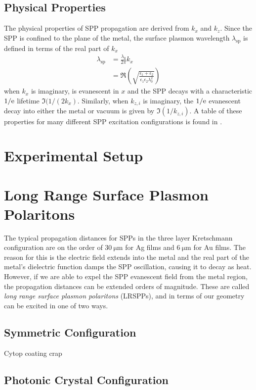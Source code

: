 \documentclass[a4paper,titlepage,onecolumn]{report}
\begin{document}
\subsection{Physical Properties}
The physical properties of SPP propagation are derived from $k_x$ and $k_z$.
Since the SPP is confined to the plane of the metal, the surface plasmon
wavelength $\lambda_\text{sp}$ is defined in terms of the real part of
$k_x$
\begin{align}
\lambda_\text{sp} &= \frac{\lambda_0}{2 \pi} k_x\\
& = \Re\left(\sqrt{
  \frac {\epsilon_1+\epsilon_2}
   {\epsilon_1 \epsilon_2 \lambda_0^2}
}\right)
\end{align}
when $k_x$ is imaginary,  is evanescent in
$x$ and the SPP decays with a characteristic $1/{\mathrm{e}}$ lifetime
$\Im(1/(2k_x)$.  Similarly, when $k_{z,i}$ is imaginary, the
$1/{\mathrm{e}}$ evanescent decay into either the metal or vacuum is given by
$\Im(1/k_{z,i})$.  A table of these properties for many different SPP
excitation configurations is found in .


\section{Experimental Setup}

\section{Long Range Surface Plasmon Polaritons}
The typical propagation distances for SPPs in the three layer Kretschmann configuration are on the order of $\SI{30}{\micro\meter}$ for Ag films and $\SI{6}{\micro\meter}$ for Au films.  The reason for this is the electric field extends into the metal and the real part of the metal's dielectric function damps the SPP oscillation, causing it to decay as heat.  However, if we are able to expel the SPP evanescent field from the metal region, the propagation distances can be extended orders of magnitude.  These are called \textit{long range surface plasmon polaritons} (LRSPPs), and in terms of our geometry can be excited in one of two ways.
\subsection{Symmetric Configuration}
Cytop coating crap
\subsection{Photonic Crystal Configuration}
\end{document}

